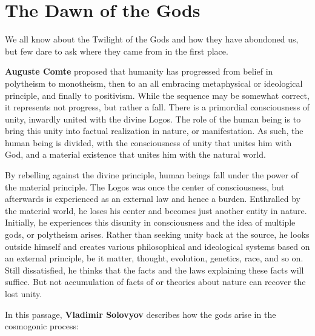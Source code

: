 \section{The Dawn of the Gods}

We all know about the Twilight of the Gods and how they have abondoned us, but few dare to ask where they came from in the first place.

\textbf{Auguste Comte} proposed that humanity has progressed from belief in polytheism to monotheism, then to an all embracing metaphysical or ideological principle, and finally to positivism. While the sequence may be somewhat correct, it represents not progress, but rather a fall. There is a primordial consciousness of unity, inwardly united with the divine Logos. The role of the human being is to bring this unity into factual realization in nature, or manifestation. As such, the human being is divided, with the consciousness of unity that unites him with God, and a material existence that unites him with the natural world.

By rebelling against the divine principle, human beings fall under the power of the material principle. The Logos was once the center of consciousness, but afterwards is experienced as an external law and hence a burden. Enthralled by the material world, he loses his center and becomes just another entity in nature. Initially, he experiences this disunity in consciousness and the idea of multiple gods, or polytheism arises. Rather than seeking unity back at the source, he looks outside himself and creates various philosophical and ideological systems based on an external principle, be it matter, thought, evolution, genetics, race, and so on. Still dissatisfied, he thinks that the facts and the laws explaining these facts will suffice. But not accumulation of facts of or theories about nature can recover the lost unity.

In this passage, \textbf{Vladimir Solovyov} describes how the gods arise in the cosmogonic process:

